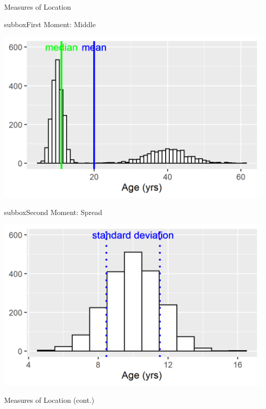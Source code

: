 \documentclass[10pt,a4paper]{article}
\begin{document}
\begin{multicols}{3}
\begin{textbox}{Measures of Location}
\begin{subbox}{subbox}{First Moment: Middle}
\begin{center}
\tiny
    \includegraphics[width=\textwidth]{Figures/Measures_of_Location/middle.png}
\end{center}

\end{subbox}

\begin{subbox}{subbox}{Second Moment: Spread}
\begin{center}
\tiny
    \includegraphics[width=\textwidth]{Figures/Measures_of_Location/range.png}
\end{center}

\end{subbox}
\end{textbox}
\begin{textbox}{Measures of Location (cont.)}


\end{textbox}
\end{multicols}
\end{document}
